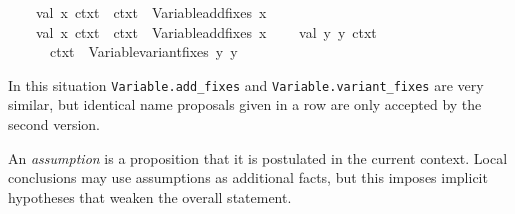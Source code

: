 \begin{isabellebody}
\ \ \ \ val\ {}{}x{}{}{}\ ctxt{}{}\ {}\ ctxt{}\ {}{}\ Variable{}add{}fixes\ {}{}x{}{}{}\isanewline
\ \ \ \ val\ {}{}x{}{}{}\ ctxt{}{}\ {}\ ctxt{}\ {}{}\ Variable{}add{}fixes\ {}{}x{}{}{}\isanewline
\isanewline
\ \ \ \ val\ {}{}y{}{}\ y{}{}{}\ ctxt{}{}\ {}\isanewline
\ \ \ \ \ \ ctxt{}\ {}{}\ Variable{}variant{}fixes\ {}{}y{}{}\ {}y{}{}{}\isanewline
\ \ {}\isanewline
{}\isamarkupfalse%
%
\endisatagML
{\isafoldML}%
%
\isadelimML
%
\endisadelimML
%
\begin{isamarkuptext}%
In this situation \verb|Variable.add_fixes| and \verb|Variable.variant_fixes| are very similar, but identical name
  proposals given in a row are only accepted by the second version.%
\end{isamarkuptext}%
\isamarkuptrue%
%
\isamarkuptrue%
%
\begin{isamarkuptext}%
An \emph{assumption} is a proposition that it is postulated in the
  current context.  Local conclusions may use assumptions as
  additional facts, but this imposes implicit hypotheses that weaken
  the overall statement.


\end{isamarkuptext}
\end{isabellebody}
